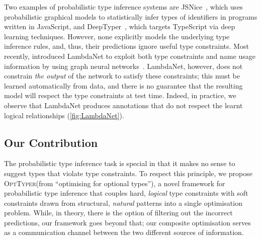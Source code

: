 \documentclass[acmsmall, review, anonymous]{acmart}\settopmatter{printfolios=true,printccs=false,printacmref=false}
\newcommand{\projectname}{\textsc{OptTyper}\xspace}
\begin{document}
Two examples of probabilistic type inference systems are JSNice~\cite{raychev15},
which uses probabilistic graphical models to statistically infer types of identifiers
in programs written in JavaScript,
and DeepTyper~\cite{hellendoorn18}, which targets TypeScript via deep learning techniques.
However, none explicitly models the underlying
type inference rules, and, thus, their predictions ignore useful type constraints.
%
Most recently, \citet{wei20} introduced LambdaNet to exploit both type constraints and name usage information by using graph neural networks~\citep{allamanis17}. LambdaNet, however, does not constrain 
\emph{the output} of the network to satisfy these constraints;
this must be learned automatically from data,
and there is no guarantee that the resulting model will respect the type constraints at test time. 
Indeed, in practice, we observe that LambdaNet
produces annotations that do not respect the learnt 
logical relationships (\cref{fig:LambdaNet}).


\subsection{Our Contribution}

The probabilistic type inference task is special in that it makes no sense to suggest types that violate type constraints.
To respect this principle, we propose \projectname (from ``optimising for optional types''), a novel framework for probabilistic type inference that couples hard, \textit{logical} type constraints with soft constraints drawn from structural, \textit{natural} patterns into a single optimisation problem. While, in theory, there is the option of filtering out the incorrect predictions, our framework goes beyond that; our composite optimisation serves as a communication channel between the two different sources of information. 

\end{document}
